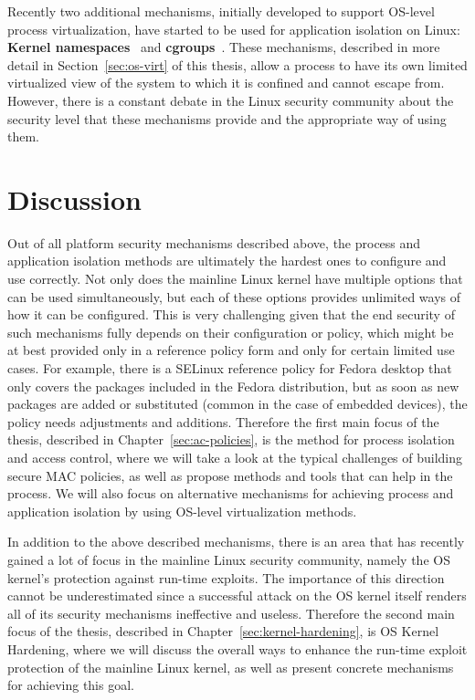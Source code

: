 Recently two additional mechanisms, initially developed to support OS-level process virtualization, have started to be used for application isolation on Linux: \textbf{Kernel namespaces}~\cite{biederman2006} and \textbf{cgroups}~\cite{cgroupsv2}. These mechanisms, described in more detail in Section~\ref{sec:os-virt} of this thesis, allow a process to have its own limited virtualized view of the system to which it is confined and cannot escape from. However, there is a constant debate in the Linux security community about the security level that these mechanisms provide and the appropriate way of using them.   

\section{Discussion}

Out of all platform security mechanisms described above, the process and application isolation methods are ultimately the hardest ones to configure and use correctly. Not only does the mainline Linux kernel have multiple options that can be used simultaneously, but each of these options provides unlimited ways of how it can be configured. This is very challenging given that the end security of such mechanisms fully depends on their configuration or policy, which might be at best provided only in a reference policy form and only for certain limited use cases. For example, there is a SELinux reference policy for Fedora desktop that only covers the packages included in the Fedora distribution, but as soon as new packages are added or substituted (common in the case of embedded devices), the policy needs adjustments and additions. Therefore the first main focus of the thesis, described in Chapter~\ref{sec:ac-policies}, is the method for process isolation and access control, where we will take a look at the typical challenges of building secure MAC policies, as well as propose methods and tools that can help in the process. We will also focus on alternative mechanisms for achieving process and application isolation by using OS-level virtualization methods. 

In addition to the above described mechanisms, there is an area that has recently gained a lot of focus in the mainline Linux security community, namely the OS kernel's protection against run-time exploits. The importance of this direction cannot be underestimated since a successful attack on the OS kernel itself renders all of its security mechanisms ineffective and useless. Therefore the second main focus of the thesis, described in Chapter~\ref{sec:kernel-hardening}, is OS Kernel Hardening, where we will discuss the overall ways to enhance the run-time exploit protection of the mainline Linux kernel, as well as present concrete mechanisms for achieving this goal. 
 
